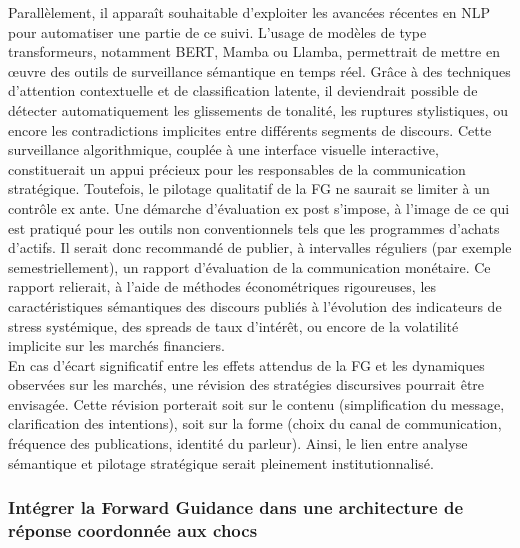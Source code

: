 Parallèlement, il apparaît souhaitable d’exploiter les avancées récentes en NLP pour automatiser une partie de ce suivi. L’usage de modèles de type transformeurs, notamment BERT, Mamba ou Llamba, permettrait de mettre en œuvre des outils de surveillance sémantique en temps réel. Grâce à des techniques d’attention contextuelle et de classification latente, il deviendrait possible de détecter automatiquement les glissements de tonalité, les ruptures stylistiques, ou encore les contradictions implicites entre différents segments de discours. Cette surveillance algorithmique, couplée à une interface visuelle interactive, constituerait un appui précieux pour les responsables de la communication stratégique. Toutefois, le pilotage qualitatif de la FG ne saurait se limiter à un contrôle ex ante. Une démarche d’évaluation ex post s’impose, à l’image de ce qui est pratiqué pour les outils non conventionnels tels que les programmes d’achats d’actifs. Il serait donc recommandé de publier, à intervalles réguliers (par exemple semestriellement), un rapport d’évaluation de la communication monétaire. Ce rapport relierait, à l’aide de méthodes économétriques rigoureuses, les caractéristiques sémantiques des discours publiés à l’évolution des indicateurs de stress systémique, des spreads de taux d’intérêt, ou encore de la volatilité implicite sur les marchés financiers.\\

En cas d’écart significatif entre les effets attendus de la FG et les dynamiques observées sur les marchés, une révision des stratégies discursives pourrait être envisagée. Cette révision porterait soit sur le contenu (simplification du message, clarification des intentions), soit sur la forme (choix du canal de communication, fréquence des publications, identité du parleur). Ainsi, le lien entre analyse sémantique et pilotage stratégique serait pleinement institutionnalisé.

\subsubsection{Intégrer la Forward Guidance dans une architecture de réponse coordonnée aux chocs}

